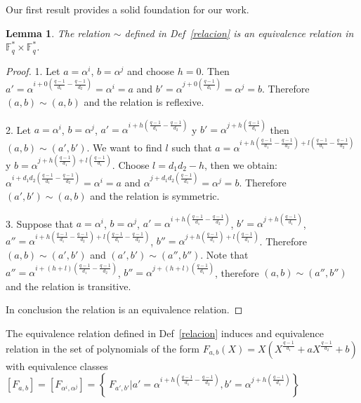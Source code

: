 \documentclass{article}
\newtheorem{lemma}[theorem]{Lemma}
\theoremstyle{definition}
\theoremstyle{remark}
\numberwithin{equation}{section}
\begin{document}
Our first result provides a solid foundation for our work.

\begin{lemma}
  
  The relation $\sim$ defined in Def~\ref{relacion} is an equivalence relation in $\mathbb{F}_q^* \times \mathbb{F}_q^*$.

\end{lemma}

\begin{proof}
  
  1. Let $a=\alpha^i$, $b=\alpha^j$ and choose $h=0$. Then $a' = \alpha^{i+0(\frac{q-1}{d_1}-\frac{q-1}{d_2})} = \alpha^i = a$ and $b' = \alpha^{j+0(\frac{q-1}{d_1})} = \alpha^j = b$. Therefore $(a,b) \sim (a,b)$ and the relation is reflexive.

  2. Let $a = \alpha^i$, $b=\alpha^j$, $a' = \alpha^{i+h(\frac{q-1}{d_1}-\frac{q-1}{d_2})}$ y $b' = \alpha^{j+h(\frac{q-1}{d_1})}$ then $(a,b) \sim (a',b')$. We want to find $l$ such that $a = \alpha^{i+h(\frac{q-1}{d_1}-\frac{q-1}{d_2})+l(\frac{q-1}{d_1}-\frac{q-1}{d_2})}$ y $b = \alpha^{j+h(\frac{q-1}{d_1})+l(\frac{q-1}{d_1})}$. Choose $l=d_1d_2-h$, then we obtain: $\alpha^{i+d_1d_2(\frac{q-1}{d_1}-\frac{q-1}{d_2})} = \alpha^i = a$ and $\alpha^{j+d_1d_2(\frac{q-1}{d_1})} = \alpha^j = b$. Therefore $(a',b') \sim (a,b) $ and the relation is symmetric.

  3. Suppose that $a = \alpha^i$, $b=\alpha^j$, $a' = \alpha^{i+h(\frac{q-1}{d_1}-\frac{q-1}{d_2})}$, $b' = \alpha^{j+h(\frac{q-1}{d_1})}$, $a'' = \alpha^{i+h(\frac{q-1}{d_1}-\frac{q-1}{d_2})+l(\frac{q-1}{d_1}-\frac{q-1}{d_2})}$, $b'' = \alpha^{j+h(\frac{q-1}{d_1})+l(\frac{q-1}{d_1})}$. Therefore $(a,b) \sim (a',b')$ and $(a',b') \sim (a'',b'')$. Note that $a'' = \alpha^{i+(h+l)(\frac{q-1}{d_1}-\frac{q-1}{d_2})}$, $b'' = \alpha^{j+(h+l)(\frac{q-1}{d_1})}$, therefore $(a,b) \sim (a'',b'')$ and the relation is transitive.

  In conclusion the relation is an equivalence relation.

\end{proof}

The equivalence relation defined in Def~\ref{relacion} induces and equivalence relation in the set of polynomials of the form $F_{a,b}(X) = X(X^{\frac{q-1}{d_1}} + aX^{\frac{q-1}{d_2}} +b)$ with equivalence classes $[F_{a,b}] = [F_{\alpha^i, \alpha^j}] = \left\{\ F_{a',b'} | a' = \alpha^{i+h(\frac{q-1}{d_1} - \frac{q-1}{d_2})}, b' = \alpha^{j+h(\frac{q-1}{d_1})} \right\}$
\end{document}
